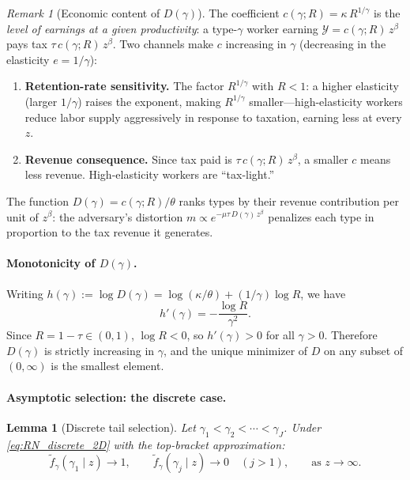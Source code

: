 \documentclass[12pt,a4paper]{article}
\theoremstyle{definition}
\theoremstyle{plain}
\newtheorem{lemma}{Lemma}[section]
\theoremstyle{remark}
\newtheorem{remark}{Remark}[section]
\newcommand{\calY}{\mathcal{Y}}
\begin{document}
\begin{remark}[Economic content of $D(\gamma)$]
\label{rem:D_economics_2D}
The coefficient $c(\gamma;R) = \kappa\,R^{1/\gamma}$ is the \emph{level of earnings at a given productivity}: a type-$\gamma$ worker earning $\calY = c(\gamma;R)\,z^{\beta}$ pays tax $\tau\,c(\gamma;R)\,z^{\beta}$.  Two channels make $c$ increasing in $\gamma$ (decreasing in the elasticity $e = 1/\gamma$):
\begin{enumerate}[label=(\roman*)]
  \item \textbf{Retention-rate sensitivity.}  The factor $R^{1/\gamma}$ with $R < 1$: a higher elasticity (larger $1/\gamma$) raises the exponent, making $R^{1/\gamma}$ smaller---high-elasticity workers reduce labor supply aggressively in response to taxation, earning less at every $z$.
  \item \textbf{Revenue consequence.}  Since tax paid is $\tau\,c(\gamma;R)\,z^{\beta}$, a smaller $c$ means less revenue.  High-elasticity workers are ``tax-light.''
\end{enumerate}
The function $D(\gamma) = c(\gamma;R)/\theta$ ranks types by their revenue contribution per unit of $z^{\beta}$: the adversary's distortion $m \propto e^{-\mu\tau\,D(\gamma)\,z^{\beta}}$ penalizes each type in proportion to the tax revenue it generates.
\end{remark}

\paragraph{Monotonicity of $D(\gamma)$.}

Writing $h(\gamma) := \log D(\gamma) = \log(\kappa/\theta) + (1/\gamma)\log R$, we have
\[
  h'(\gamma) = -\frac{\log R}{\gamma^2}.
\]
Since $R = 1-\tau \in (0,1)$, $\log R < 0$, so $h'(\gamma) > 0$ for all $\gamma > 0$.  Therefore $D(\gamma)$ is strictly increasing in $\gamma$, and the unique minimizer of $D$ on any subset of $(0,\infty)$ is the smallest element.

\paragraph{Asymptotic selection: the discrete case.}

\begin{lemma}[Discrete tail selection]
\label{lem:discrete_selection_2D}
Let $\gamma_1 < \gamma_2 < \cdots < \gamma_J$.  Under \eqref{eq:RN_discrete_2D} with the top-bracket approximation:
\[
  \widetilde{f}_{\gamma}(\gamma_1 \mid z) \to 1, \qquad \widetilde{f}_{\gamma}(\gamma_j \mid z) \to 0 \quad (j > 1), \qquad \text{as } z \to \infty.
\]
\end{lemma}
\end{document}
